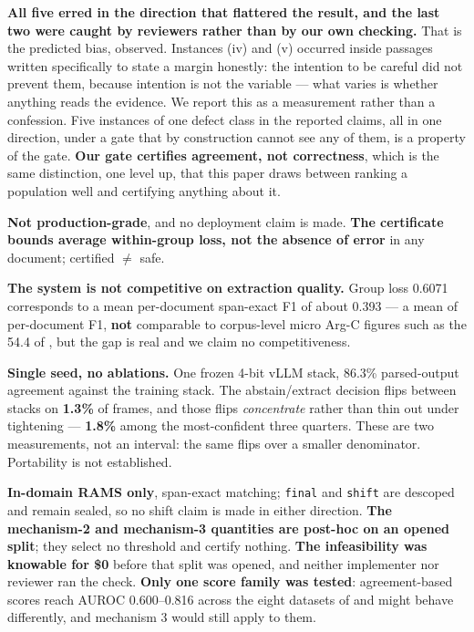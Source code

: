 \documentclass[11pt]{article}
\begin{document}
\textbf{All five erred in the direction that flattered the result, and the last two were caught by
reviewers rather than by our own checking.} That is the predicted bias, observed. Instances (iv)
and (v) occurred inside passages written specifically to state a margin honestly: the intention to
be careful did not prevent them, because intention is not the variable --- what varies is whether
anything reads the evidence. We report this as a measurement rather than a confession. Five
instances of one defect class in the reported claims, all in one direction, under a gate that by
construction cannot see any of them, is a property of the gate. \textbf{Our gate certifies agreement, not correctness},
which is the same distinction, one level up, that this paper draws between ranking a population
well and certifying anything about it.

\textbf{Not production-grade}, and no deployment claim is made. \textbf{The certificate bounds
average within-group loss, not the absence of error} in any document; certified $\neq$ safe.

\textbf{The system is not competitive on extraction quality.} Group loss 0.6071 corresponds to a
mean per-document span-exact F1 of about 0.393 --- a mean of per-document F1, \textbf{not}
comparable to corpus-level micro Arg-C figures such as the 54.4 of \citet{huang2026rose}, but the
gap is real and we claim no competitiveness.

\textbf{Single seed, no ablations.} One frozen 4-bit vLLM stack, 86.3\% parsed-output agreement
against the training stack. The abstain/extract decision flips between stacks on \textbf{1.3\%} of
frames, and those flips \emph{concentrate} rather than thin out under tightening --- \textbf{1.8\%}
among the most-confident three quarters. These are two measurements, not an interval: the same
flips over a smaller denominator. Portability is not established.

\textbf{In-domain RAMS only}, span-exact matching; \texttt{final} and \texttt{shift} are descoped
and remain sealed, so no shift claim is made in either direction. \textbf{The mechanism-2 and
mechanism-3 quantities are post-hoc on an opened split}; they select no threshold and certify
nothing. \textbf{The infeasibility was knowable for \$0} before that split was opened, and neither
implementer nor reviewer ran the check. \textbf{Only one score family was tested}: agreement-based
scores reach AUROC 0.600--0.816 across the eight datasets of \citet{kotte2026crc} and might behave
differently, and mechanism 3 would still apply to them.
\end{document}
